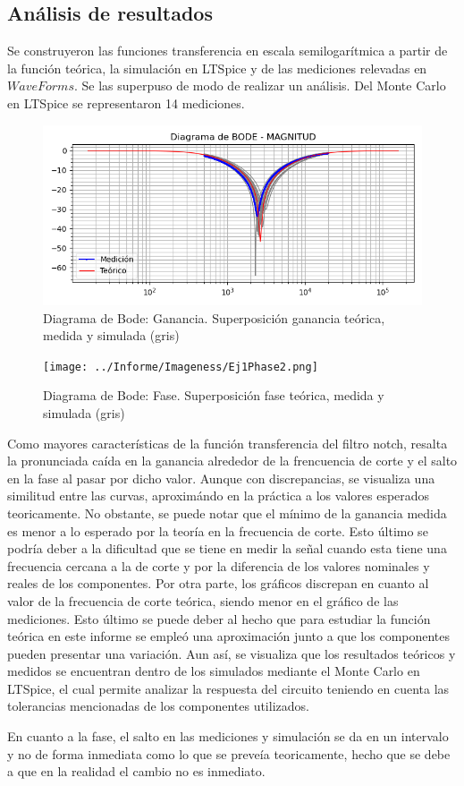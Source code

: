\subsection{Análisis de resultados}

Se construyeron las funciones transferencia en escala semilogarítmica a partir de la función teórica, la simulación en LTSpice y de las mediciones relevadas en $WaveForms$. Se las superpuso de modo de realizar un análisis. Del Monte Carlo en LTSpice se representaron 14 mediciones.

\begin{figure}[H]
\centering
\includegraphics[scale =1]{../Informe/Imagenes/Ej1Gain2.png}
\caption{Diagrama de Bode: Ganancia. Superposición ganancia teórica, medida y simulada (gris)}
\end{figure}

\begin{figure}[H]
	\centering
	\texttt{[image: ../Informe/Imageness/Ej1Phase2.png]}
	\caption{Diagrama de Bode: Fase. Superposición fase teórica, medida y simulada (gris)}
\end{figure}


Como mayores características de la función transferencia del filtro notch, resalta la pronunciada caída en la ganancia alrededor de la frencuencia de corte y el salto en la fase al pasar por dicho valor. 
Aunque con discrepancias, se visualiza una similitud entre las curvas, aproximándo en la práctica a los valores esperados teoricamente. No obstante, se puede notar que el mínimo de la ganancia medida es menor a lo esperado por la teoría en la frecuencia de corte. Esto último se podría deber a la dificultad que se tiene en medir la señal cuando esta tiene una frecuencia cercana a la de corte y por la diferencia de los valores nominales y reales de los componentes. Por otra parte, los gráficos discrepan en cuanto al valor de la frecuencia de corte teórica, siendo menor en el gráfico de las mediciones. Esto último se puede deber al hecho que para estudiar la función teórica en este informe se empleó una aproximación junto a que los componentes pueden presentar una variación. Aun así, se visualiza que los resultados teóricos y medidos se encuentran dentro de los simulados mediante el Monte Carlo en LTSpice, el cual permite analizar la respuesta del circuito teniendo en cuenta las tolerancias mencionadas de los componentes utilizados.

En cuanto a la fase, el salto en las mediciones y simulación se da en un intervalo y no de forma inmediata como lo que se preveía teoricamente, hecho que se debe a que en la realidad el cambio no es inmediato. 


